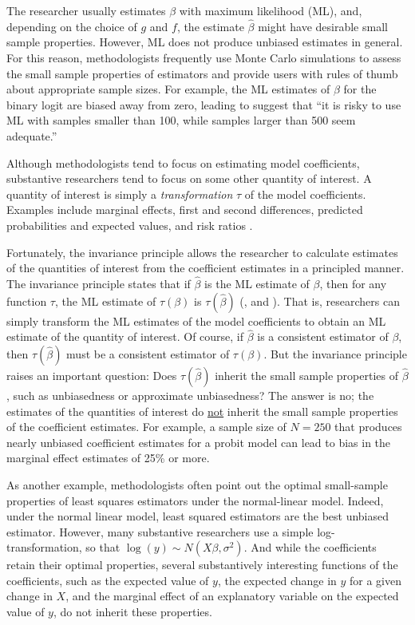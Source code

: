 \documentclass[12pt]{article}
\begin{document}
The researcher usually estimates $\beta$ with maximum likelihood (ML), and, depending on the choice of $g$ and $f$, the estimate $\hat{\beta}$ might have desirable small sample properties. 
However, ML does not produce unbiased estimates in general. 
For this reason, methodologists frequently use Monte Carlo simulations to assess the small sample properties of estimators and provide users with rules of thumb about appropriate sample sizes.
For example, the ML estimates of $\beta$ for the binary logit are biased away from zero, leading \citet[p. 54]{Long1997} to suggest that ``it is risky to use ML with samples smaller than 100, while samples larger than 500 seem adequate.''

Although methodologists tend to focus on estimating model coefficients, substantive researchers tend to focus on some other quantity of interest.
A quantity of interest is simply a \textit{transformation} $\tau$ of the model coefficients. 
Examples include marginal effects, first and second differences, predicted probabilities and expected values, and risk ratios \citep{KingTomzWittenberg2000}.

Fortunately, the invariance principle allows the researcher to calculate estimates of the quantities of interest from the coefficient estimates in a principled manner.
The invariance principle states that if $\hat{\beta}$ is the ML estimate of $\beta$, then for any function $\tau$, the ML estimate of $\tau(\beta)$ is $\tau(\hat{\beta})$ (\citealt[pp. 75-76]{King1989}, and \citealt[pp. 320-321]{CasellaBerger2002}).
That is, researchers can simply transform the ML estimates of the model coefficients to obtain an ML estimate of the quantity of interest.
Of course, if $\hat{\beta}$ is a consistent estimator of $\beta$, then $\tau(\hat{\beta})$ must be a consistent estimator of $\tau(\beta)$. 
But the invariance principle raises an important question: Does $\tau(\hat{\beta})$ inherit the small sample properties of $\hat{\beta}$, such as unbiasedness or approximate unbiasedness?
The answer is no; the estimates of the quantities of interest do \underline{not} inherit the small sample properties of the coefficient estimates. 
For example, a sample size of $N = 250$ that produces nearly unbiased coefficient estimates for a probit model can lead to bias in the marginal effect estimates of 25\% or more.

As another example, methodologists often point out the optimal small-sample properties of least squares estimators under the normal-linear model. 
Indeed, under the normal linear model, least squared estimators are the best unbiased estimator. 
However, many substantive researchers use a simple log-transformation, so that $\log(y) \sim N(X\beta, \sigma^2)$.
And while the coefficients retain their optimal properties, several substantively interesting functions of the coefficients, such as the expected value of $y$, the expected change in $y$ for a given change in $X$, and the marginal effect of an explanatory variable on the expected value of $y$, do not inherit these properties. 
\end{document}
